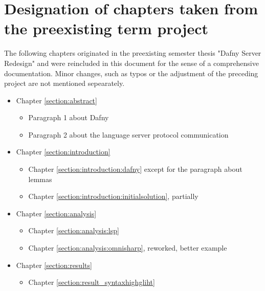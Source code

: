\section{Designation of chapters taken from the preexisting term project}
The following chapters originated in the preexisting semester thesis "Dafny Server Redesign"\cite{sa} and were reincluded in this document for the sense of a comprehensive documentation. Minor changes, such as typos or the adjustment of the preceding project are not mentioned sepearately.
\begin{itemize}
    \item Chapter \ref{section:abstract} 
        \begin{itemize}
            \item Paragraph 1 about Dafny
            \item Paragraph 2 about the language server protocol communication
        \end{itemize}
    \item Chapter \ref{section:introduction} 
        \begin{itemize}
            \item Chapter \ref{section:introduction:dafny} except for the paragraph about lemmas
            \item Chapter \ref{section:introduction:initialsolution}, partially
        \end{itemize}

    \item Chapter \ref{section:analysis} 
        \begin{itemize}
            \item Chapter \ref{section:analysis:lsp}
            \item Chapter \ref{section:analysis:omnisharp}, reworked, better example
        \end{itemize}
    
    \item Chapter \ref{section:results} 
        \begin{itemize}
            \item Chapter \ref{section:result_syntaxhighgliht}
        \end{itemize}

        

\end{itemize}